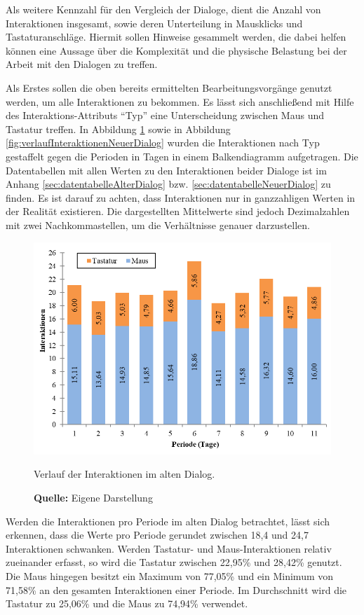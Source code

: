 Als weitere Kennzahl für den Vergleich der Dialoge, dient die Anzahl von Interaktionen insgesamt, sowie deren Unterteilung in Mausklicks und Tastaturanschläge. Hiermit sollen Hinweise gesammelt werden, die dabei helfen können eine Aussage über die Komplexität und die physische Belastung bei der Arbeit mit den Dialogen zu treffen.

Als Erstes sollen die oben bereits ermittelten Bearbeitungsvorgänge genutzt werden, um alle Interaktionen zu bekommen. Es lässt sich anschließend mit Hilfe des Interaktions-Attributs \enquote{Typ} eine Unterscheidung zwischen Maus und Tastatur treffen. In Abbildung \ref{fig:verlaufInteraktionenAlterDialog} sowie in Abbildung \ref{fig:verlaufInteraktionenNeuerDialog} wurden die Interaktionen nach Typ gestaffelt gegen die Perioden in Tagen in einem Balkendiagramm aufgetragen. Die Datentabellen mit allen Werten zu den Interaktionen beider Dialoge ist im Anhang \ref{sec:datentabelleAlterDialog} bzw. \ref{sec:datentabelleNeuerDialog} zu finden. Es ist darauf zu achten, dass Interaktionen nur in ganzzahligen Werten in der Realität existieren. Die dargestellten Mittelwerte sind jedoch Dezimalzahlen mit zwei Nachkommastellen, um die Verhältnisse genauer darzustellen.
\begin{figure}[H]
  \centering
  \includegraphics[]{img/Interaktionen_Alter_Dialog.png}
  \caption{Verlauf der Interaktionen im alten Dialog.}
  \caption*{\textbf{Quelle:} Eigene Darstellung}
  \label{fig:verlaufInteraktionenAlterDialog}
\end{figure}
Werden die Interaktionen pro Periode im alten Dialog betrachtet, lässt sich erkennen, dass die Werte pro Periode gerundet zwischen 18,4 und 24,7 Interaktionen schwanken. Werden Tastatur- und Maus-Interaktionen relativ zueinander erfasst, so wird die Tastatur zwischen 22,95\% und 28,42\% genutzt. Die Maus hingegen besitzt ein Maximum von 77,05\% und ein Minimum von 71,58\% an den gesamten Interaktionen einer Periode. Im Durchschnitt wird die Tastatur zu 25,06\% und die Maus zu 74,94\% verwendet.

